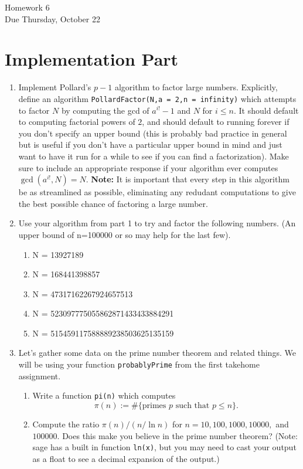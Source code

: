 \documentclass[11pt]{article}
\begin{document}
\begin{center}
\Large {Homework 6}\\
\small {Due Thursday, October 22}
\end{center}
\section*{Implementation Part}
\begin{enumerate}
  \item{
  Implement Pollard's $p-1$ algorithm to factor large numbers.  Explicitly, define an algorithm \verb|PollardFactor(N,a = 2,n = infinity)| which attempts to factor $N$ by computing the gcd of $a^{i!}-1$ and $N$ for $i\le n$.  It should default to computing factorial powers of $2$, and should default to running forever if you don't specify an upper bound (this is probably bad practice in general but is useful if you don't have a particular upper bound in mind and just want to have it run for a while to see if you can find a factorization).  Make sure to include an appropriate response if your algorithm ever computes $\gcd(a^{i!},N)=N$.  \textbf{Note:} It is important that every step in this algorithm be as streamlined as possible, eliminating any redudant computations to give the best possible chance of factoring a large number.
  }
  \item{
  Use your algorithm from part 1 to try and factor the following numbers.  (An upper bound of n=100000 or so may help for the last few).
  \begin{enumerate}
    \item{N = 13927189}
    \item{N = 168441398857}
    \item{N = 47317162267924657513}
    \item{N = 523097775055862871433433884291}
    \item{N = 515459117588889238503625135159}
  \end{enumerate}
  }
  \item{
  Let's gather some data on the prime number theorem and related things.  We will be using your function \verb|probablyPrime| from the first takehome assignment.
  \begin{enumerate}
    \item{
    Write a function \verb|pi(n)| which computes
    \[\pi(n):=\#\{\text{primes }p\text{ such that }p\le n\}.\]
    }
    \item{
    Compute the ratio $\pi(n)/(n/\ln n)$ for $n = 10,100,1000,10000,$ and $100000$.  Does this make you believe in the prime number theorem?  (Note: sage has a built in function \verb|ln(x)|, but you may need to cast your output as a float to see a decimal expansion of the output.)
}
\end{enumerate}}
\end{enumerate}
\end{document}
